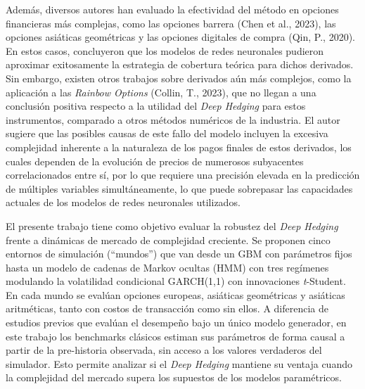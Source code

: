 \documentclass[11pt,a4paper,spanish]{article}
\numberwithin{equation}{section} %
\begin{document}
Además, diversos autores han evaluado la efectividad del método en opciones financieras más complejas, como las opciones barrera (Chen et al., 2023), las opciones asiáticas geométricas y las opciones digitales de compra (Qin, P., 2020). En estos casos, concluyeron que los modelos de redes neuronales pudieron aproximar exitosamente la estrategia de cobertura teórica para dichos derivados. Sin embargo, existen otros trabajos sobre derivados aún más complejos, como la aplicación a las \textit{Rainbow Options} (Collin, T., 2023), que no llegan a una conclusión positiva respecto a la utilidad del \textit{Deep Hedging} para estos instrumentos, comparado a otros métodos numéricos de la industria. El autor sugiere que las posibles causas de este fallo del modelo incluyen la excesiva complejidad inherente a la naturaleza de los pagos finales de estos derivados, los cuales dependen de la evolución de precios de numerosos subyacentes correlacionados entre sí, por lo que requiere una precisión elevada en la predicción de múltiples variables simultáneamente, lo que puede sobrepasar las capacidades actuales de los modelos de redes neuronales utilizados.

El presente trabajo tiene como objetivo evaluar la robustez del \textit{Deep Hedging} frente a dinámicas de mercado de complejidad creciente. Se proponen cinco entornos de simulación (``mundos'') que van desde un GBM con parámetros fijos hasta un modelo de cadenas de Markov ocultas (HMM) con tres regímenes modulando la volatilidad condicional GARCH(1,1) con innovaciones \textit{t}-Student. En cada mundo se evalúan opciones europeas, asiáticas geométricas y asiáticas aritméticas, tanto con costos de transacción como sin ellos. A diferencia de estudios previos que evalúan el desempeño bajo un único modelo generador, en este trabajo los benchmarks clásicos estiman sus parámetros de forma causal a partir de la pre-historia observada, sin acceso a los valores verdaderos del simulador. Esto permite analizar si el \textit{Deep Hedging} mantiene su ventaja cuando la complejidad del mercado supera los supuestos de los modelos paramétricos.
\end{document}

